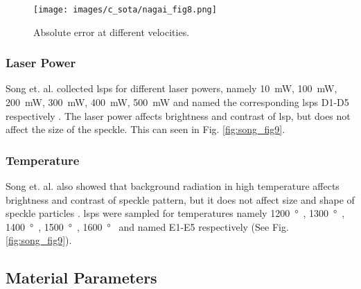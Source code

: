 
    \begin{figure}[h]
        \centering
        \texttt{[image: images/c\_sota/nagai\_fig8.png]}
        \caption{Absolute error at different velocities. \cite{nagai}}
        \label{fig:nagai_fig8}
    \end{figure}
    

    \subsubsection*{Laser Power}
    Song et. al. collected \glspl{lsp} for different laser powers, namely \SI{10}{\milli\watt}, \SI{100}{\milli\watt}, \SI{200}{\milli\watt}, \SI{300}{\milli\watt}, \SI{400}{\milli\watt}, \SI{500}{\milli\watt} and named the corresponding \glspl{lsp} D1-D5 respectively \cite{song}. The laser power affects brightness and contrast of \gls{lsp}, but does not affect the size of the speckle. This can seen in Fig. \ref{fig:song_fig9}.


    \subsubsection*{Temperature}
    Song et. al. also showed that background radiation in high temperature affects brightness and contrast of speckle pattern, but it does not affect size and shape of speckle particles \cite{song}. \glspl{lsp} were sampled for temperatures namely \SI{1200}{\degree\celcius}, \SI{1300}{\degree\celcius}, \SI{1400}{\degree\celcius}, \SI{1500}{\degree\celcius}, \SI{1600}{\degree\celcius} and named E1-E5 respectively (See Fig. \ref{fig:song_fig9}).


\vspace{5mm}
\subsection{Material Parameters}

